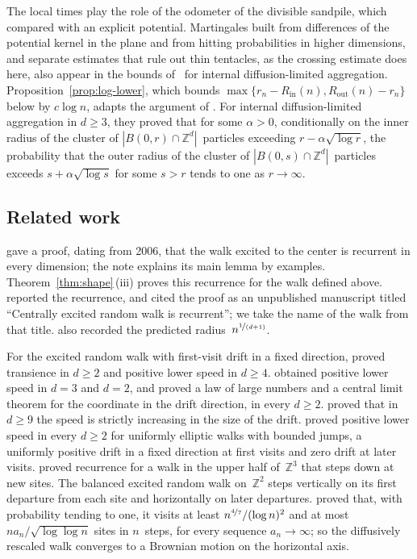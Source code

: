 \documentclass[11pt]{amsart}
\theoremstyle{plain}
\theoremstyle{definition}
\newcommand{\Z}{\mathbb Z}
\newcommand{\nf}{\nicefrac}
\newcommand{\Rin}{R_{\mathrm{in}}}
\newcommand{\Rout}{R_{\mathrm{out}}}
\numberwithin{equation}{section}
\begin{document}
The local times play the role of the odometer of the divisible sandpile, which \citet{LevinePeres2009} compared with an explicit potential. Martingales built from differences of the potential kernel in the plane and from hitting probabilities in higher dimensions, and separate estimates that rule out thin tentacles, as the crossing estimate does here, also appear in the bounds of~\citet*{JerisonLevineSheffield2012,JerisonLevineSheffield2013} for internal diffusion-limited aggregation. Proposition~\ref{prop:log-lower}, which bounds $\max\{r_n-\Rin(n),\Rout(n)-r_n\}$ below by $c\log n$, adapts the argument of \citet{AsselahGaudilliere2014}. For internal diffusion-limited aggregation in $d\geq3$, they proved that for some $\alpha>0$, conditionally on the inner radius of the cluster of $|B(0,r)\cap\Z^d|$~particles exceeding $r-\alpha\sqrt{\log r}$, the probability that the outer radius of the cluster of $|B(0,s)\cap\Z^d|$~particles exceeds $s+\alpha\sqrt{\log s}$ for some $s>r$ tends to one as $r\to\infty$.

\subsection{Related work}\label{sec:related}

\citet{Kozma2013Recurrence} gave a proof, dating from 2006, that the walk excited to the center is recurrent in every dimension; the note explains its main lemma by examples. Theorem~\ref{thm:shape}\,(iii) proves this recurrence for the walk defined above. \citet{Kozma2013} reported the recurrence, and \citet*{DemboHuangSidoravicius2014,DemboHuangSidoravicius2014Growing} cited the proof as an unpublished manuscript titled ``Centrally excited random walk is recurrent''; we take the name of the walk from that title. \citet*{BenjaminiDuminilCopinKozmaLucas2020} also recorded the predicted radius~$n^{\nf{1}{(d+1)}}$.

For the excited random walk with first-visit drift in a fixed direction, \citet*{BenjaminiWilson2003} proved transience in $d\geq2$ and positive lower speed in $d\geq4$. \citet{Kozma2003Speed,Kozma2005Speed} obtained positive lower speed in $d=3$ and $d=2$, and \citet{BerardRamirez2007} proved a law of large numbers and a central limit theorem for the coordinate in the drift direction, in every $d\geq2$. \citet*{vanderHofstadHolmes2010} proved that in $d\geq9$ the speed is strictly increasing in the size of the drift. \citet*{MenshikovPopovRamirezVachkovskaia2012} proved positive lower speed in every $d\geq2$ for uniformly elliptic walks with bounded jumps, a uniformly positive drift in a fixed direction at first visits and zero drift at later visits. \citet*{AmirBenjaminiKozma2008} proved recurrence for a walk in the upper half of~$\Z^3$ that steps down at new sites. The balanced excited random walk on~$\Z^2$ steps vertically on its first departure from each site and horizontally on later departures. \citet*{AngelHolmesRamirez2023} proved that, with probability tending to one, it visits at least $n^{\nf47}/(\log n)^2$ and at most $na_n/\sqrt{\log\log n}$ sites in $n$~steps, for every sequence $a_n\to\infty$; so the diffusively rescaled walk converges to a Brownian motion on the horizontal axis.
\end{document}
